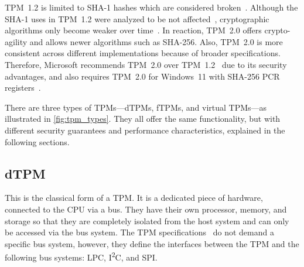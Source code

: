 %


TPM~1.2 is limited to SHA-1 hashes which are considered broken~\cite{cryptoeprint:2005/010, Wang2005, Stevens2017}.
Although the SHA-1 uses in TPM~1.2 were analyzed to be not affected~\cite{sha1tpm12}, cryptographic algorithms only become weaker over time~\cite{Arthur2015}.
In reaction, TPM~2.0 offers crypto-agility and allows newer algorithms such as SHA-256.
Also, TPM~2.0 is more consistent across different implementations because of broader specifications.
Therefore, Microsoft recommends TPM~2.0 over TPM~1.2~\cite{micrec} due to its security advantages, and also requires TPM~2.0 for Windows~11 with SHA-256 PCR registers~\cite{win11req}.




There are three types of \acp{TPM}---\aclp{dTPM}, \aclp{fTPM}, and virtual TPMs---as illustrated in \autoref{fig:tpm_types}.
They all offer the same functionality, but with different security guarantees and performance characteristics, explained in the following sections.


\subsection{\Acl{dTPM}}

This is the classical form of a TPM\@.
It is a dedicated piece of hardware, connected to the CPU via a bus.
They have their own processor, memory, and storage so that they are completely isolated from the host system and can only be accessed via the bus system.
The TPM specifications~\cite{tpm20, tcgPcClientTpmProfile} do not demand a specific bus system, however, they define the interfaces between the TPM and the following bus systems: LPC, I\textsuperscript{2}C, and SPI\@.


